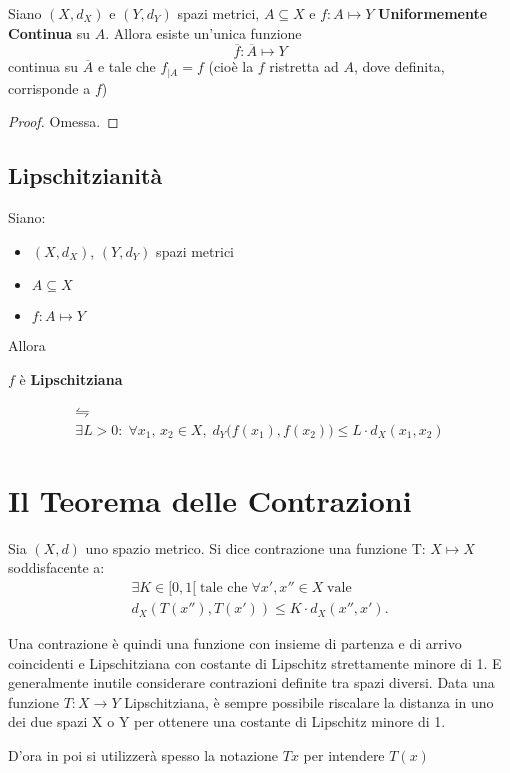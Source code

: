 \begin{proposition}
	Siano $(X,d_X)$ e $(Y,d_Y)$ spazi metrici, $A \subseteq X$ e $f:A \mapsto Y$ \textbf{Uniformemente Continua} su $A$. Allora esiste un'unica funzione
	$$\overline{f}: \overline{A} \mapsto Y$$
	continua su $\overline{A}$ e tale che $f_{|A} = f$ (cioè la $f$ ristretta ad $A$, dove definita, corrisponde a $f$)
	\begin{proof}
		Omessa.
	\end{proof}
\end{proposition}

\subsection{Lipschitzianità}
\begin{definition}
	\label{def:lips}
	Siano:
	\begin{itemize}
		\item $(X,d_X)$, $(Y,d_Y)$ spazi metrici
		\item $A \subseteq X$
		\item $f:A \mapsto Y$
	\end{itemize}
	Allora
	\begin{center}
		$f$ è \textbf{Lipschitziana}
	\end{center}
	\begin{equation*}\label{eq1}
		\begin{gathered}
			\leftrightharpoons \\
			\exists L > 0:\; \forall x_1,\,x_2 \in X,\;d_Y\bigl(f(x_1),f(x_2)\bigr)\leq L \cdot d_X(x_1,x_2)
		\end{gathered}
	\end{equation*}
\end{definition}

\section{Il Teorema delle Contrazioni}
\begin{definition}[Contrazione]
	\label{def:contrazione}
	Sia $(X, d)$ uno spazio metrico. Si dice contrazione una funzione T: $X \mapsto X$ soddisfacente a:
	\begin{align}
		\label{eq:def_contrazione}
		\exists K \in [0, 1[\;\text{tale che}\;\forall x',x''\in X\;\text{vale}\\
		d_X(T(x''), T(x')) \le K \cdot d_X(x'', x').
	\end{align}


	Una contrazione è quindi una funzione con insieme di partenza e di arrivo coincidenti e
	Lipschitziana con costante di Lipschitz strettamente minore di 1.
	E generalmente inutile considerare contrazioni definite tra spazi diversi. Data una funzione
	$T: X\rightarrow Y$ Lipschitziana, è sempre possibile riscalare la distanza in uno dei due spazi X o Y
	per ottenere una costante di Lipschitz minore di 1.
	\begin{note}
		D'ora in poi si utilizzerà spesso la notazione $Tx$ per intendere $T(x)$
	\end{note}
\end{definition}

